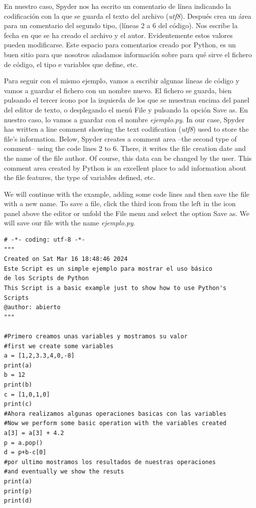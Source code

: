 \begin{paracol}{2}
En nuestro caso, Spyder nos ha escrito un comentario de línea indicando la codificación con la que se guarda el texto del archivo (\emph{utf8}). Después crea un área para un comentario del segundo tipo, (líneas 2  a 6 del código). Nos escribe la fecha en que se ha creado el archivo y el autor. Evidentemente estos valores pueden modificarse. Este espacio para comentarios creado por Python, es un buen sitio para que nosotros añadamos información sobre para qué sirve el fichero de código, el tipo e variables que define, etc.

Para seguir con el mismo ejemplo, vamos a escribir algunas líneas de código y vamos a guardar el fichero con un nombre nuevo. El fichero se guarda, bien pulsando el tercer icono por la izquierda de los que se muestran encima del panel del editor de texto, o desplegando el menú File y pulsando la opción Save as. En nuestro caso, lo vamos a guardar con el nombre \emph{ejemplo.py}.
\switchcolumn
In our case, Spyder has written a line comment showing the text codification (\emph{utf8}) used to store the file's information. Below, Spyder creates a comment area --the second type of comment-- using the code lines 2 to 6. There, it writes the file creation date and the name of the file author. Of course, this data can be changed by the user. This comment area created by Python is an excellent place to add information about the file features, the type of variables defined, etc.

We will continue with the example, adding some code lines and then save the file with a new name. To save a file, click the third icon from the left in the icon panel above the editor or unfold the File menu and select the option Save as. We will save our file with the name \emph{ejemplo.py}.
\end{paracol}

\begin{verbatim}
# -*- coding: utf-8 -*-
"""
Created on Sat Mar 16 18:48:46 2024
Este Script es un simple ejemplo para mostrar el uso básico
de los Scripts de Python
This Script is a basic example just to show how to use Python's
Scripts
@author: abierto 
"""

#Primero creamos unas variables y mostramos su valor
#first we create some variables
a = [1,2,3.3,4,0,-8]
print(a)
b = 12
print(b)
c = [1,0,1,0]
print(c)
#Ahora realizamos algunas operaciones basicas con las variables
#Now we perform some basic operation with the variables created
a[3] = a[3] + 4.2
p = a.pop()
d = p+b-c[0]
#por ultimo mostramos los resultados de nuestras operaciones
#and eventually we show the resuts 
print(a)
print(p)
print(d)
\end{verbatim}

